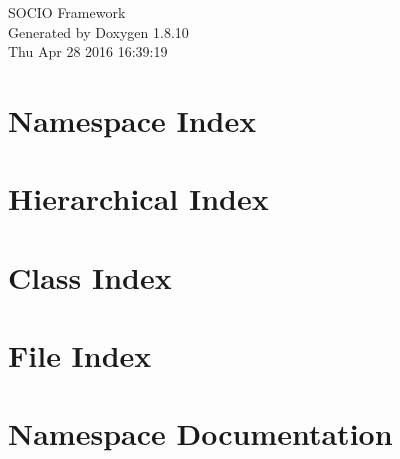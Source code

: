 \documentclass[twoside]{book}
\newcommand{\+}{\discretionary{\mbox{\scriptsize$\hookleftarrow$}}{}{}}
\newcommand{\clearemptydoublepage}{%
  \newpage{\pagestyle{empty}\cleardoublepage}%
}
\begin{document}
\hypersetup{pageanchor=false,
             bookmarks=true,
             bookmarksnumbered=true,
             pdfencoding=unicode
            }
\begin{titlepage}
\vspace*{7cm}
\begin{center}%
{\Large S\+O\+C\+I\+O Framework }\\
\vspace*{1cm}
{\large Generated by Doxygen 1.8.10}\\
\vspace*{0.5cm}
{\small Thu Apr 28 2016 16:39:19}\\
\end{center}
\end{titlepage}
\clearemptydoublepage
\tableofcontents
\clearemptydoublepage
{}
\hypersetup{pageanchor=true}

\chapter{Namespace Index}

\chapter{Hierarchical Index}

\chapter{Class Index}

\chapter{File Index}

\chapter{Namespace Documentation}








\end{document}
